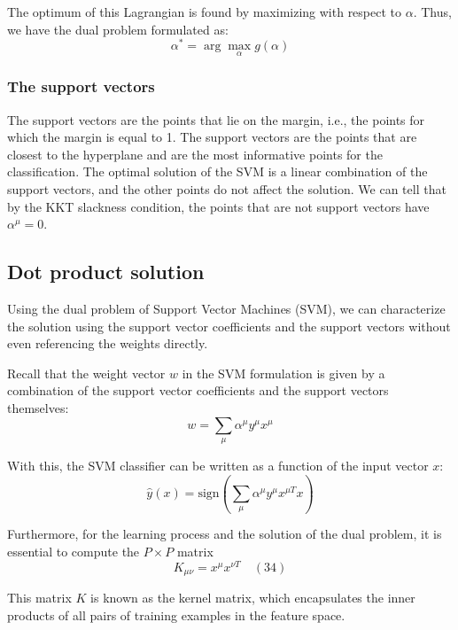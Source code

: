 \documentclass[11pt]{book} %
\begin{document}
The optimum of this Lagrangian is found by maximizing with respect to \( \alpha \). Thus, we have the dual problem formulated as:
\begin{equation}
    \alpha^* = \arg \max_{\alpha} g(\alpha) 
\end{equation}


\subsubsection{The support vectors}
The support vectors are the points that lie on the margin, i.e., the points for which the margin is equal to 1.
The support vectors are the points that are closest to the hyperplane and are the most informative points for the classification.
The optimal solution of the SVM is a linear combination of the support vectors, and the other points do not affect the solution.
We can tell that by the KKT slackness condition, the points that are not support vectors have $\alpha^{\mu} = 0$.


%
%

\subsection{Dot product solution}

Using the dual problem of Support Vector Machines (SVM), we can characterize the solution using the support vector coefficients and the support vectors without even referencing the weights directly.

Recall that the weight vector \( w \) in the SVM formulation is given by a combination of the support vector coefficients and the support vectors themselves:
\begin{equation}
    w = \sum_{\mu} \alpha^{\mu} y^{\mu} x^{\mu} 
\end{equation}

With this, the SVM classifier can be written as a function of the input vector \( x \):
\begin{equation}
    \hat{y}(x) = \text{sign} \left( \sum_{\mu} \alpha^{\mu} y^{\mu} x^{\mu T} x \right) 
\end{equation}

Furthermore, for the learning process and the solution of the dual problem, it is essential to compute the \( P \times P \) matrix
\begin{equation}
    K_{\mu \nu} = x^{\mu} x^{\nu T} \quad (34)
\end{equation}

This matrix \( K \) is known as the kernel matrix, 
which encapsulates the inner products of all pairs of training examples in the feature space. 
\end{document}
